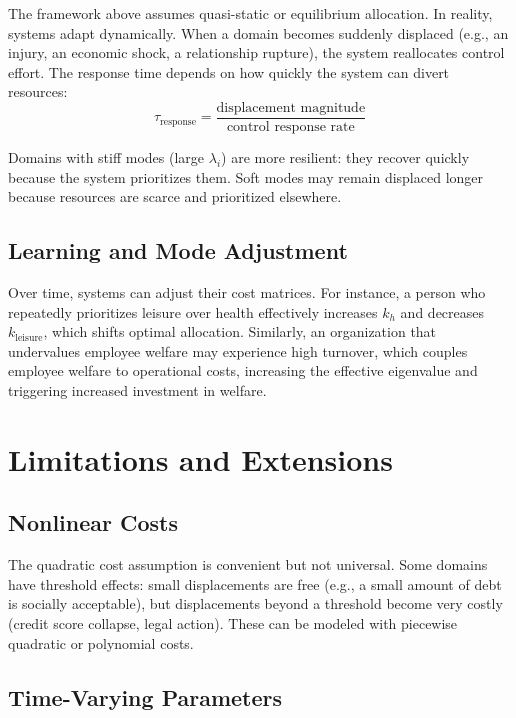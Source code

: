 \documentclass[12pt]{article}
\begin{document}
The framework above assumes quasi-static or equilibrium allocation. In reality, systems adapt dynamically. When a domain becomes suddenly displaced (e.g., an injury, an economic shock, a relationship rupture), the system reallocates control effort. The response time depends on how quickly the system can divert resources:
\begin{equation}
\tau_{\text{response}} = \frac{\text{displacement magnitude}}{\text{control response rate}}
\end{equation}

Domains with stiff modes (large $\lambda_i$) are more resilient: they recover quickly because the system prioritizes them. Soft modes may remain displaced longer because resources are scarce and prioritized elsewhere.

\subsection{Learning and Mode Adjustment}

Over time, systems can adjust their cost matrices. For instance, a person who repeatedly prioritizes leisure over health effectively increases $k_h$ and decreases $k_{\text{leisure}}$, which shifts optimal allocation. Similarly, an organization that undervalues employee welfare may experience high turnover, which couples employee welfare to operational costs, increasing the effective eigenvalue and triggering increased investment in welfare.

\section{Limitations and Extensions}

\subsection{Nonlinear Costs}

The quadratic cost assumption is convenient but not universal. Some domains have threshold effects: small displacements are free (e.g., a small amount of debt is socially acceptable), but displacements beyond a threshold become very costly (credit score collapse, legal action). These can be modeled with piecewise quadratic or polynomial costs.

\subsection{Time-Varying Parameters}
\end{document}
